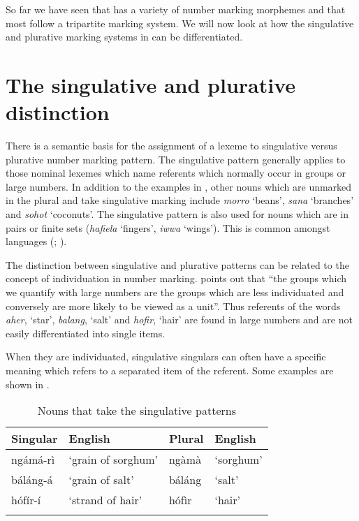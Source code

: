 \documentclass[output=paper]{langsci/langscibook}
\begin{document}
So far we have seen that  has a variety of number marking morphemes and that most follow a tripartite marking system. We will now look at how the singulative and plurative marking systems in  can be differentiated.

\section{The singulative and plurative distinction}\label{sec:moodie:3}

There is a semantic basis for the assignment of a lexeme to singulative versus plurative number marking pattern. The singulative pattern generally applies to those nominal lexemes which name referents which normally occur in groups or large numbers. In addition to the examples in , other nouns which are unmarked in the plural and take singulative marking include \textit{morro} ‘beans’, \textit{sana} ‘branches’ and \textit{sohot} ‘coconuts’. The singulative pattern is also used for nouns which are in pairs or finite sets (\textit{hafiela} ‘fingers’, \textit{iwwa} ‘wings’). This is common amongst  languages (\citealt[216]{Dimmendaal2000}; \citealt[119]{Creisselsetal2008}).

The distinction between singulative and plurative patterns can be related to the concept of individuation in number marking. \citet[217]{Corbett2000} points out that “the groups which we quantify with large numbers are the groups which are less individuated and conversely are more likely to be viewed as a unit”. Thus referents of the  words \textit{aher}, ‘star’, \textit{balang}, ‘salt’ and \textit{hofir}, ‘hair’ are found in large numbers and are not easily differentiated into single items.

When they are individuated, singulative singulars can often have a specific meaning which refers to a separated item of the referent.  Some examples are shown in . 

\begin{table}
\begin{tabularx}{\textwidth}{XlXX}
\lsptoprule

  {Singular} &   {English} &   {Plural} &   {English}\\ 
\midrule
 ngámá-rì &  ‘grain of sorghum’ &  ngàmà &  ‘sorghum’\\
 báláng-á &  ‘grain of salt’ &  báláng &  ‘salt’\\
 hófír-í &  ‘strand of hair’ &  hófìr &  ‘hair’\\
\lspbottomrule
\end{tabularx}
\caption{Nouns that take the singulative patterns}
\label{tab:moodie:6}
\end{table}
\end{document}
